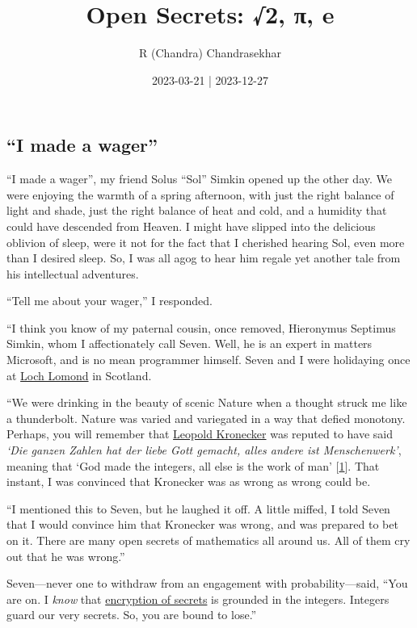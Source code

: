\documentclass[
  a4paper,
]{article}
\title{Open Secrets: √2, π, e}
\author{R (Chandra) Chandrasekhar}
\date{2023-03-21 | 2023-12-27}
\begin{document}
\maketitle

\thispagestyle{empty}


\hypertarget{i-made-a-wager}{%
\subsection{``I made a wager''}\label{i-made-a-wager}}

``I made a wager'', my friend Solus ``Sol'' Simkin opened up the other
day. We were enjoying the warmth of a spring afternoon, with just the
right balance of light and shade, just the right balance of heat and
cold, and a humidity that could have descended from Heaven. I might have
slipped into the delicious oblivion of sleep, were it not for the fact
that I cherished hearing Sol, even more than I desired sleep. So, I was
all agog to hear him regale yet another tale from his intellectual
adventures.

``Tell me about your wager,'' I responded.

``I think you know of my paternal cousin, once removed, Hieronymus
Septimus Simkin, whom I affectionately call Seven. Well, he is an expert
in matters Microsoft, and is no mean programmer himself. Seven and I
were holidaying once at
\href{https://www.nationalparks.uk/park/loch-lomond-the-trossachs/}{Loch
Lomond} in Scotland.

``We were drinking in the beauty of scenic Nature when a thought struck
me like a thunderbolt. Nature was varied and variegated in a way that
defied monotony. Perhaps, you will remember that
\href{https://en.wikipedia.org/wiki/Leopold_Kronecker}{Leopold
Kronecker} was reputed to have said \emph{`Die ganzen Zahlen hat der
liebe Gott gemacht, alles andere ist Menschenwerk'}, meaning that `God
made the integers, all else is the work of man'
{[}\protect\hyperlink{ref-kronecker}{1}{]}. That instant, I was
convinced that Kronecker was as wrong as wrong could be.

``I mentioned this to Seven, but he laughed it off. A little miffed, I
told Seven that I would convince him that Kronecker was wrong, and was
prepared to bet on it. There are many open secrets of mathematics all
around us. All of them cry out that he was wrong.''

Seven---never one to withdraw from an engagement with
probability---said, ``You are on. I \emph{know} that
\href{https://cloud.google.com/learn/what-is-encryption}{encryption of
secrets} is grounded in the integers. Integers guard our very secrets.
So, you are bound to lose.''
\end{document}
